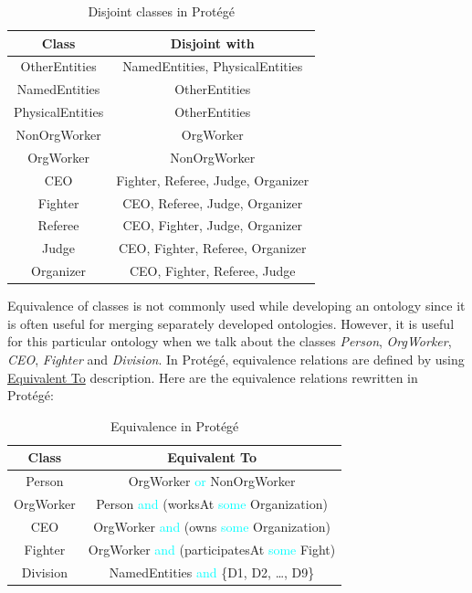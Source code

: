\documentclass[a4paper]{article}
\begin{document}
\begin{table}[H]
	\centering
	\begin{tabular}{c|c}
		\hline
		\textbf{Class} & \textbf{Disjoint with} \\
		\hline
		OtherEntities & NamedEntities, PhysicalEntities \\
		NamedEntities & OtherEntities \\
		PhysicalEntities & OtherEntities \\
		\hline
		NonOrgWorker & OrgWorker \\
		OrgWorker & NonOrgWorker \\
		\hline
		CEO & Fighter, Referee, Judge, Organizer \\
		Fighter & CEO, Referee, Judge, Organizer \\
		Referee & CEO, Fighter, Judge, Organizer \\
		Judge & CEO, Fighter, Referee, Organizer \\
		Organizer & CEO, Fighter, Referee, Judge \\
		\hline
	\end{tabular}
	\caption{Disjoint classes in Prot\'eg\'e}
	\label{tab:disjoint_classes}
\end{table}
Equivalence of classes is not commonly used while developing an ontology since it is often useful for merging separately developed ontologies. However, it is useful for this particular ontology when we 
talk about the classes \textit{Person}, \textit{OrgWorker}, \textit{CEO}, \textit{Fighter} and \textit{Division}. In Prot\'eg\'e, equivalence relations are defined by using \underline{Equivalent To} 
description. Here are the equivalence relations rewritten in Prot\'eg\'e:

\begin{table}[H]
	\centering
	\begin{tabular}{c|c}
		\hline
		\textbf{Class} & \textbf{Equivalent To} \\
		\hline
		Person & OrgWorker \textcolor{cyan}{or} NonOrgWorker \\
		\hline
		OrgWorker & Person \textcolor{cyan}{and} (worksAt \textcolor{cyan}{some} Organization) \\
		\hline
		CEO & OrgWorker \textcolor{cyan}{and} (owns \textcolor{cyan}{some} Organization) \\
		\hline
		Fighter & OrgWorker \textcolor{cyan}{and} (participatesAt \textcolor{cyan}{some} Fight) \\
		\hline
		Division & NamedEntities \textcolor{cyan}{and} \{D1, D2, \dots, D9\} \\
	\end{tabular}
	\caption{Equivalence in Prot\'eg\'e}
	\label{tab:protege_equivalence}
\end{table}
\end{document}
